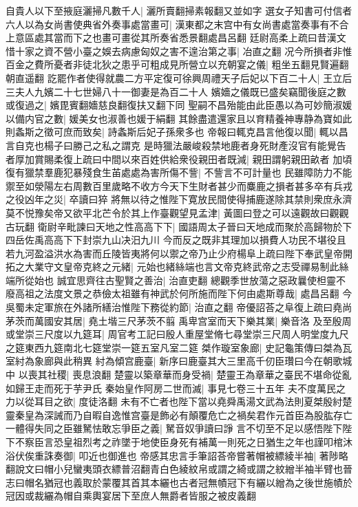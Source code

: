 自貴人以下至掖庭灑掃凡數千人|{
	灑所賣翻掃素報翻又並如字}
選女子知書可付信者六人以為女尚書使典省外奏事處當畫可|{
	漢東都之末宫中有女尚書處當奏事有不合上意區處其當而下之也畫可畫從其所奏省悉景翻處昌呂翻}
廷尉高柔上疏曰昔漢文惜十家之資不營小臺之娛去病慮匈奴之害不遑治第之事|{
	冶直之翻}
况今所損者非惟百金之費所憂者非徒北狄之患乎可粗成見所營立以充朝宴之儀|{
	粗坐五翻見賢遍翻朝直遥翻}
訖罷作者使得就農二方平定復可徐興周禮天子后妃以下百二十人|{
	王立后三夫人九嬪二十七世婦八十一御妻是為百二十人}
嬪嬙之儀既已盛矣竊聞後庭之數或復過之|{
	嬪毘賓翻嬙慈良翻復扶又翻下同}
聖嗣不昌殆能由此臣愚以為可妙簡淑媛以備内官之數|{
	媛美女也淑善也媛于絹翻}
其餘盡遣還家且以育精養神專静為寶如此則螽斯之徵可庶而致矣|{
	詩螽斯后妃子孫衆多也}
帝報曰輒克昌言他復以聞|{
	輒以昌言自克也楊子曰勝己之私之謂克}
是時獵法嚴峻殺禁地鹿者身死財產沒官有能覺告者厚加賞賜柔復上疏曰中間以來百姓供給衆役親田者既減|{
	親田謂躬親田畝者}
加頃復有獵禁羣鹿犯暴殘食生苖處處為害所傷不訾|{
	不訾言不可計量也}
民雖障防力不能禦至如滎陽左右周數百里歲略不收方今天下生財者甚少而麋鹿之損者甚多卒有兵戎之役凶年之災|{
	卒讀曰猝}
將無以待之惟陛下寛放民間使得捕鹿遂除其禁則衆庶永濟莫不悦豫矣帝又欲平北芒令於其上作臺觀望見孟津|{
	黃圖曰登之可以遠觀故曰觀觀古玩翻}
衛尉辛毗諫曰天地之性高高下下|{
	國語周太子晉曰天地成而聚於高歸物於下四岳佐禹高高下下封崇九山决汨九川}
今而反之既非其理加以損費人功民不堪役且若九河盈溢洪水為害而丘陵皆夷將何以禦之帝乃止少府楊阜上疏曰陛下奉武皇帝開拓之大業守文皇帝克終之元緒|{
	元始也緒絲端也言文帝克終武帝之志受禪易制此絲端所從始也}
誠宜思齊往古聖賢之善治|{
	治直吏翻}
總觀季世放蕩之惡政曩使柦靈不廢高祖之法度文景之恭儉太祖雖有神武於何所施而陛下何由處斯尊哉|{
	處昌呂翻}
今吳蜀未定軍旅在外諸所繕治惟陛下務從約節|{
	治直之翻}
帝優詔荅之阜復上疏曰堯尚茅茨而萬國安其居|{
	堯土堦三尺茅茨不翦}
禹卑宫室而天下樂其業|{
	樂音洛}
及至殷周或堂崇三尺度以九筵耳|{
	周官考工記曰殷人重屋堂脩七尋堂崇三尺周人明堂度九尺之筵東西九筵南北七筵堂崇一筵五室凡室二筵}
桀作璇室象廊|{
	史記龜策傳曰桀為瓦室紂為象廊與此稍異}
紂為傾宫鹿臺|{
	新序曰鹿臺其大三里高千仞臣瓚曰今在朝歌城中}
以喪其社稷|{
	喪息浪翻}
楚靈以築章華而身受禍|{
	楚靈王為章華之臺民不堪命從亂如歸王走而死于芋尹氏}
秦始皇作阿房二世而滅|{
	事見七卷三十五年}
夫不度萬民之力以從耳目之欲|{
	度徒洛翻}
未有不亡者也陛下當以堯舜禹湯文武為法則夏桀殷紂楚靈秦皇為深誡而乃自暇自逸惟宫臺是飾必有顛覆危亡之禍矣君作元首臣為股肱存亡一體得失同之臣雖駑怯敢忘爭臣之義|{
	駑音奴爭讀曰諍}
言不切至不足以感悟陛下陛下不察臣言恐皇祖烈考之祚墜于地使臣身死有補萬一則死之日猶生之年也謹叩棺沐浴伏俟重誅奏御|{
	叩近也御進也}
帝感其忠言手筆詔荅帝嘗著帽被縹綾半袖|{
	著陟略翻說文曰帽小兒蠻夷頭衣縹普沼翻青白色綾紋帛或謂之綺或謂之紋繒半袖半臂也晉志曰帽名猶冠也義取於蒙覆其首其本纚也古者冠無幘冠下有纚以繒為之後世施幘於冠因或裁纚為帽自乘輿宴居下至庶人無爵者皆服之被皮義翻}
